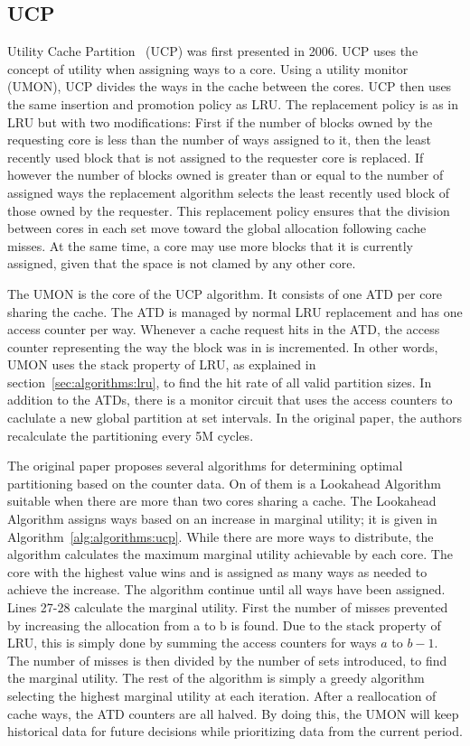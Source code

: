 \subsection{UCP}
\label{sec:algorithms:ucp}

Utility Cache Partition~\cite{Qureshi2006} (UCP) was first presented in 2006. 
UCP uses the concept of utility when assigning ways to a core.
Using a utility monitor (UMON), UCP divides the ways in the cache between the cores.
UCP then uses the same insertion and promotion policy as LRU.
The replacement policy is as in LRU but with two modifications:
First if the number of blocks owned by the requesting core is less than the number of ways assigned to it, then the least recently used block that is not assigned to the requester core is replaced.
If however the number of blocks owned is greater than or equal to the number of assigned ways the replacement algorithm selects the least recently used block of those owned by the requester.
This replacement policy ensures that the division between cores in each set move toward the global allocation following cache misses.
At the same time, a core may use more blocks that it is currently assigned, given that the space is not clamed by any other core.

The UMON is the core of the UCP algorithm.
It consists of one ATD per core sharing the cache. 
The ATD is managed by normal LRU replacement and has one access counter per way.
Whenever a cache request hits in the ATD, the access counter representing the way the block was in is incremented.
In other words, UMON uses the stack property of LRU, as explained in section~\ref{sec:algorithms:lru}, to find the hit rate of all valid partition sizes.
In addition to the ATDs, there is a monitor circuit that uses the access counters to caclulate a new global partition at set intervals.
In the original paper, the authors recalculate the partitioning every 5M cycles.

The original paper proposes several algorithms for determining optimal partitioning based on the counter data. 
On of them is a Lookahead Algorithm suitable when there are more than two cores sharing a cache.
The Lookahead Algorithm assigns ways based on an increase in marginal utility; it is given in Algorithm~\ref{alg:algorithms:ucp}.
While there are more ways to distribute, the algorithm calculates the maximum marginal utility achievable by each core. 
The core with the highest value wins and is assigned as many ways as needed to achieve the increase.
The algorithm continue until all ways have been assigned.
Lines 27-28 calculate the marginal utility. 
First the number of misses prevented by increasing the allocation from a to b is found.
Due to the stack property of LRU, this is simply done by summing the access counters for ways $a$ to $b-1$.
The number of misses is then divided by the number of sets introduced, to find the marginal utility.
The rest of the algorithm is simply a greedy algorithm selecting the highest marginal utility at each iteration.
After a reallocation of cache ways, the ATD counters are all halved.
By doing this, the UMON will keep historical data for future decisions while prioritizing data from the current period.

